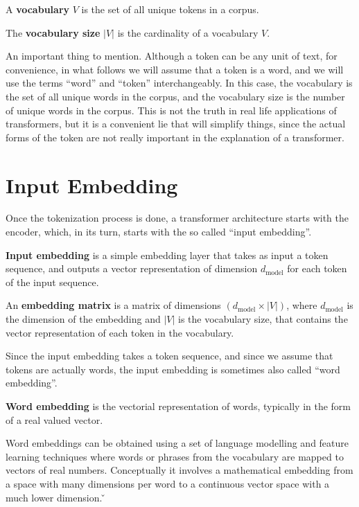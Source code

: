 \bd[Vocabulary]
A \textbf{vocabulary} $V$ is the set of all unique tokens in a corpus.
\ed

The \textbf{vocabulary size} $|V|$ is the cardinality of a vocabulary $V$.
\ed

An important thing to mention. Although a token can be any unit of text, for convenience, in what follows we will
assume that a token is a word, and we will use the terms ``word'' and ``token'' interchangeably. In this case, the
vocabulary is the set of all unique words in the corpus, and the vocabulary size is the number of unique words in
the corpus. This is not the truth in real life applications of transformers, but it is a convenient lie that will
simplify things, since the actual forms of the token are not really important in the explanation of a transformer.

\section{Input Embedding}


Once the tokenization process is done, a transformer architecture starts with the encoder, which, in its turn, starts
with the so called ``input embedding''.

\textbf{Input embedding} is a simple embedding layer that takes as input a token sequence, and outputs a vector
representation of dimension $d_{\text{model}}$ for each token of the input sequence.
\ed

\be
{}
\ee

An \textbf{embedding matrix} is a matrix of dimensions $(d_{\text{model}} \times |V|)$, where $d_{\text{model}}$ is the
dimension of the embedding and $|V|$ is the vocabulary size, that contains the vector representation of each token
in the vocabulary.
\ed

Since the input embedding takes a token sequence, and since we assume that tokens are actually words, the input
embedding is sometimes also called ``word embedding''.

\textbf{Word embedding} is the vectorial representation of words, typically in the form of a real valued vector.
\ed

Word embeddings can be obtained using a set of language modelling and feature learning techniques where words or
phrases from the vocabulary are mapped to vectors of real numbers. Conceptually it involves a mathematical embedding
from a space with many dimensions per word to a continuous vector space with a much lower dimension. \v

